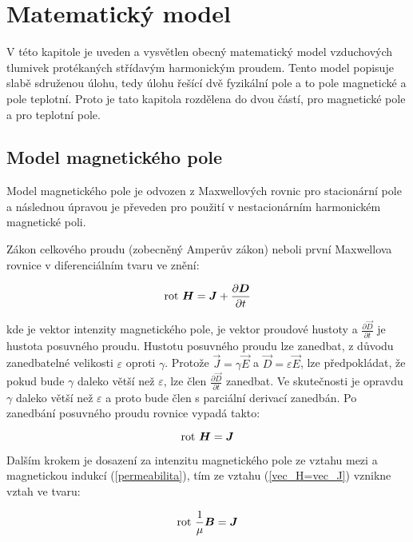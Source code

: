 \chapter{Matematický model} 
\label{matematicky_model}
V této kapitole je uveden a vysvětlen obecný matematický model vzduchových tlumivek protékaných střídavým harmonickým proudem. Tento model popisuje slabě sdruženou úlohu, tedy úlohu řešící dvě fyzikální pole a to pole magnetické a pole teplotní. Proto je tato kapitola rozdělena do dvou částí, pro magnetické pole a pro teplotní pole.

\section{Model magnetického pole}
Model magnetického pole je odvozen z Maxwellových rovnic pro stacionární pole a následnou úpravou je převeden pro použití v nestacionárním harmonickém magnetické poli.

	Zákon celkového proudu (zobecněný Amperův zákon) neboli první Maxwellova rovnice v diferenciálním tvaru ve znění:
	
\begin{equation}
	\mathrm{rot}\  \mbox{\boldmath$H$} = \mbox{\boldmath$J$} + \frac{\partial \mbox{\boldmath$D$}}{\partial t}
\end{equation}

kde  je vektor intenzity magnetického pole,  je vektor proudové hustoty a $\frac{\partial \vec{D}}{\partial t}$ je hustota posuvného proudu. Hustotu posuvného proudu lze zanedbat, z důvodu zanedbatelné velikosti $\varepsilon$ oproti $\gamma$. Protože $\vec{J} =\gamma \vec{E} $ a $\vec{D} =\varepsilon \vec{E} $, lze předpokládat, že pokud bude $\gamma$ daleko větší než $\varepsilon$, lze člen $\frac{\partial \vec{D}}{\partial t}$ zanedbat. Ve skutečnosti je opravdu $\gamma$ daleko větší než $\varepsilon$ a proto bude člen s parciální derivací zanedbán.
Po zanedbání posuvného proudu rovnice vypadá takto:

\begin{equation}
	\mathrm{rot}\  \mbox{\boldmath$H$} = \mbox{\boldmath$J$}
	\label{vec_H=vec_J}
\end{equation}

Dalším krokem je dosazení za intenzitu magnetického pole  ze vztahu mezi  a magnetickou indukcí  (\ref{permeabilita}), tím ze vztahu (\ref{vec_H=vec_J}) vznikne vztah ve tvaru:

\begin{equation}
	\mathrm{rot}\  \frac{1}{\mu} {\mbox{\boldmath$B$}} = \mbox{\boldmath$J$}
\end{equation}

